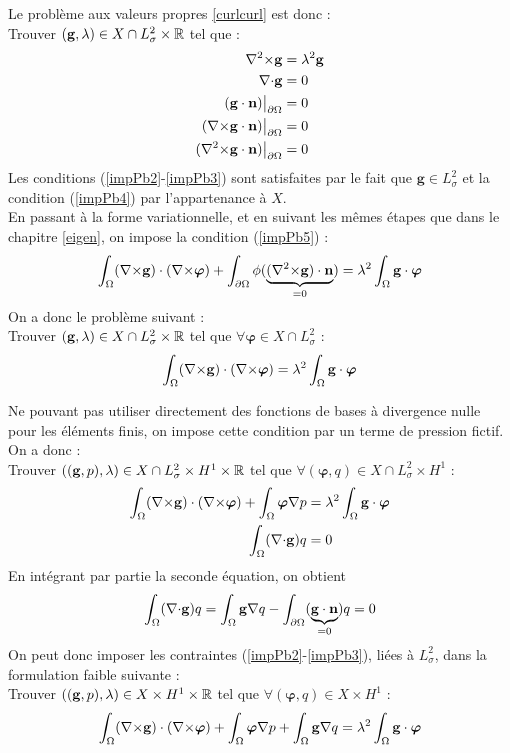 Le problème aux valeurs propres \ref{curlcurl} est donc :\\
Trouver $(\mathbf{g},\lambda)\in X\cap L^2_\sigma\times{\mathbb{R}}$ tel que :
\begin{align}
{\nabla^2\times}\mathbf{g}&=\lambda^2\mathbf{g} \label{impPb1}\\
{\nabla\cdot}\mathbf{g}&=0 \label{impPb2}\\
(\mathbf{g}\cdot\mathbf{n}){\big\rvert_{\partial\Omega}}&=0 \label{impPb3}\\
({\nabla\times}\mathbf{g}\cdot\mathbf{n}){\big\rvert_{\partial\Omega}}&=0 \label{impPb4}\\
({\nabla^2\times}\mathbf{g}\cdot\mathbf{n}){\big\rvert_{\partial\Omega}}&=0 \label{impPb5}
\end{align}
Les conditions (\ref{impPb2}-\ref{impPb3}) sont satisfaites par le fait que $\mathbf{g}\in L^2_\sigma$ et la condition (\ref{impPb4}) par l'appartenance à $X$.\\

En passant à la forme variationnelle, et en suivant les mêmes étapes que dans le chapitre \ref{eigen}, on impose la condition (\ref{impPb5}) :
\[ \int_\Omega ({\nabla\times}\mathbf{g})\cdot({\nabla\times}\bm{\varphi}) + \int_{\partial\Omega} \phi(\underbrace{({\nabla^2\times} \mathbf{g})\cdot\mathbf{n}}_{=0})= \lambda^2\int_\Omega \mathbf{g}\cdot\bm{\varphi} \]
On a donc le problème suivant :\\
Trouver $(\mathbf{g},\lambda)\in X\cap L^2_\sigma\times{\mathbb{R}}$ tel que $\forall \bm{\varphi}\in X\cap L^2_\sigma$ :
\[ \int_\Omega ({\nabla\times}\mathbf{g})\cdot({\nabla\times}\bm{\varphi}) = \lambda^2\int_\Omega \mathbf{g}\cdot\bm{\varphi} \]

Ne pouvant pas utiliser directement des fonctions de bases à divergence nulle pour les éléments finis, on impose cette condition par un terme de pression fictif. On a donc :\\
Trouver $((\mathbf{g},p),\lambda)\in X\cap L^2_\sigma \times H^1 \times {\mathbb{R}}$ tel que $\forall (\bm{\varphi},q)\in X\cap L^2_\sigma \times H^1$ :
\begin{align*}
\int_\Omega ({\nabla\times}\mathbf{g})\cdot({\nabla\times}\bm{\varphi}) + \int_\Omega\bm{\varphi}{\nabla} p &= \lambda^2\int_\Omega \mathbf{g}\cdot\bm{\varphi}\\
\int_\Omega ({\nabla\cdot}\mathbf{g}) q &= 0
\end{align*}
En intégrant par partie la seconde équation, on obtient
\[ \int_\Omega ({\nabla\cdot}\mathbf{g}) q = \int_\Omega \mathbf{g}{\nabla} q - \int_{\partial\Omega} (\underbrace{\mathbf{g}\cdot \mathbf{n}}_{=0})q = 0 \]
On peut donc imposer les contraintes (\ref{impPb2}-\ref{impPb3}), liées à $L^2_\sigma$, dans la formulation faible suivante :\\
Trouver $((\mathbf{g},p),\lambda)\in X \times H^1 \times {\mathbb{R}}$ tel que $\forall (\bm{\varphi},q)\in X \times H^1$ :
\[ \int_\Omega ({\nabla\times}\mathbf{g})\cdot({\nabla\times}\bm{\varphi}) + \int_\Omega\bm{\varphi}{\nabla} p + \int_\Omega \mathbf{g}{\nabla} q = \lambda^2\int_\Omega \mathbf{g}\cdot\bm{\varphi} \]

